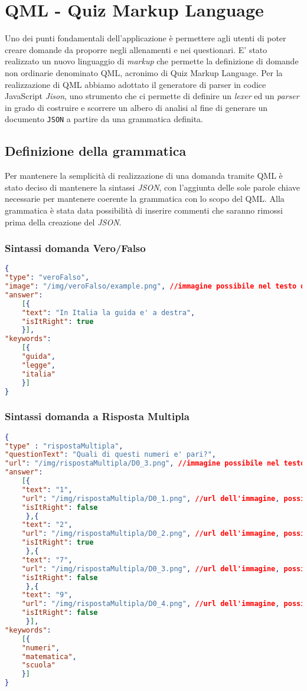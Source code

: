 \newpage
\section{QML - Quiz Markup Language}
Uno dei punti fondamentali dell'applicazione è permettere agli utenti di poter creare domande da proporre negli allenamenti e nei questionari. E' stato realizzato un nuovo linguaggio di \textit{markup} che permette la definizione di domande non ordinarie denominato QML, acronimo di Quiz Markup Language.
Per la realizzazione di QML abbiamo adottato il generatore di parser in codice JavaScript \textit{Jison}, uno strumento che ci permette di definire un \textit{lexer} ed un \textit{parser} in grado di costruire e scorrere un albero di analisi al fine di generare un documento \texttt{JSON} a partire da una grammatica definita.

\subsection{Definizione della grammatica}
Per mantenere la semplicità di realizzazione di una domanda tramite QML è stato deciso di mantenere la sintassi \textit{JSON}, con l'aggiunta delle sole parole chiave necessarie per mantenere coerente la grammatica con lo scopo del QML. Alla grammatica è stata data possibilità di inserire commenti che saranno rimossi prima della creazione del \textit{JSON}.

\subsubsection{Sintassi domanda Vero/Falso}
\begin{lstlisting}[language=json,firstnumber=1]
{	
"type": "veroFalso",
"image": "/img/veroFalso/example.png", //immagine possibile nel testo della domanda vero e falso
"answer":
	[{
	"text": "In Italia la guida e' a destra",
	"isItRight": true
	}],
"keywords":
	[{
	"guida",
	"legge",
	"italia"
	}] 
}
\end{lstlisting}

\subsubsection{Sintassi domanda a Risposta Multipla}
\begin{lstlisting}[language=json,firstnumber=1]
{	
"type" : "rispostaMultipla",
"questionText": "Quali di questi numeri e' pari?",
"url": "/img/rispostaMultipla/D0_3.png", //immagine possibile nel testo della domanda risposta multipla
"answer":
	[{
	"text": "1",
	"url": "/img/rispostaMultipla/D0_1.png", //url dell'immagine, possibile campo facoltativo
	"isItRight": false
	 },{
	"text": "2",
	"url": "/img/rispostaMultipla/D0_2.png", //url dell'immagine, possibile campo facoltativo
	"isItRight": true
	 },{
	"text": "7",
	"url": "/img/rispostaMultipla/D0_3.png", //url dell'immagine, possibile campo facoltativo
	"isItRight": false
	 },{
	"text": "9",
	"url": "/img/rispostaMultipla/D0_4.png", //url dell'immagine, possibile campo facoltativo
	"isItRight": false
	 }],
"keywords":
	[{
	"numeri",
	"matematica",
	"scuola"
	}]
}
\end{lstlisting}

